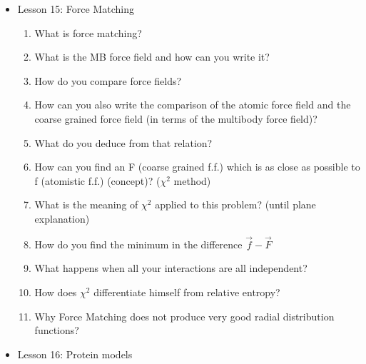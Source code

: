 {\begin{itemize}
\begin{enumerate}
        \item What do you have to compute by using inverse Monte Carlo? (susceptibility matrix)
        \item What does the susceptibility matrix tell you?
        \item How do you calculate the infinitesimal change in potential energy after
        \item How does Monte Carlo converge?
        \item obtain from relative entropy the susceptibility matrix
        \item What softer do you generally use to parametrize the CG  potential?
        \item Is the cut-off important in Boltzmann inversion?
        \item Is parametrization always correct or is it specific?
    \end{enumerate}
    \item Lesson 15: Force Matching
    \begin{enumerate}
        \item What is force matching?
        \item What is the MB force field and how can you write it?
        \item How do you compare force fields?
        \item How can you also write the comparison of the atomic force field and the coarse grained force field (in terms of the multibody force field)?
        \item What do you deduce from that relation?
        \item How can you find an F (coarse grained f.f.) which is as close as possible to f (atomistic f.f.) (concept)? ($\chi^2$ method) 
        \item What is the meaning of $\chi^2$ applied to this problem? (until plane explanation)
        \item How do you find the minimum in the difference $\vec{f} - \vec{F}$
        \item What happens when all your interactions are all independent?
        \item How does $\chi^2$ differentiate himself from relative entropy?
        \item Why Force Matching does not produce very good radial distribution functions?
    \end{enumerate}
    \item Lesson 16: Protein models
    \begin{enumerate}

\end{enumerate}
\end{itemize}}
